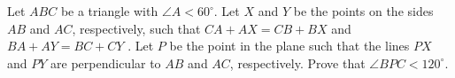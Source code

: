 Let $ ABC$ be a triangle with $ \angle A < 60^\circ$. Let $ X$ and $ Y$ be the points on the sides $ AB$ and $ AC$, respectively, such that $ CA + AX = CB + BX$ and $ BA + AY = BC + CY$ . Let $ P$ be the point in the plane such that the lines $ PX$ and $ PY$ are perpendicular to $ AB$ and $ AC$, respectively. Prove that $ \angle BPC < 120^\circ$.